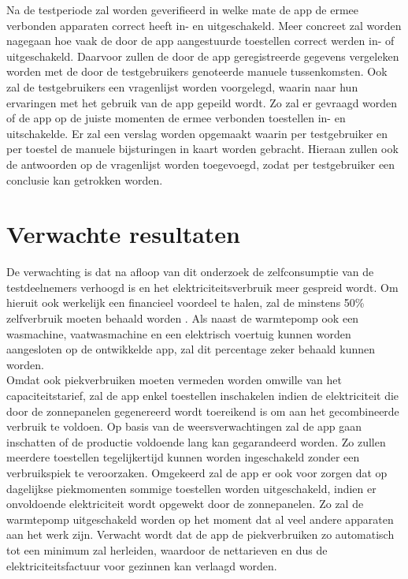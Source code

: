 \documentclass{hogent-article}
\begin{document}
Na de testperiode zal worden geverifieerd in welke mate de app de ermee verbonden apparaten correct heeft in- en uitgeschakeld. Meer concreet zal worden nagegaan hoe vaak de door de app aangestuurde toestellen correct werden in- of uitgeschakeld. Daarvoor zullen de door de app geregistreerde gegevens vergeleken worden met de door de testgebruikers genoteerde manuele tussenkomsten. Ook zal de testgebruikers een vragenlijst worden voorgelegd, waarin naar hun ervaringen met het gebruik van de app gepeild wordt. Zo zal er gevraagd worden of de app op de juiste momenten de ermee verbonden toestellen in- en uitschakelde. Er zal een verslag worden opgemaakt waarin per testgebruiker en per toestel de manuele bijsturingen in kaart worden gebracht. Hieraan zullen ook de antwoorden op de vragenlijst worden toegevoegd, zodat per testgebruiker een conclusie kan getrokken worden.

\section{Verwachte resultaten}%
\label{sec:verwachte-resultaten}

De verwachting is dat na afloop van dit onderzoek de zelfconsumptie van de testdeelnemers verhoogd is en het elektriciteitsverbruik meer gespreid wordt. Om hieruit ook werkelijk een financieel voordeel te halen, zal de minstens 50\% zelfverbruik moeten behaald worden \autocite{Selleslagh2021}. Als naast de warmtepomp ook een wasmachine, vaatwasmachine en een elektrisch voertuig kunnen worden aangesloten op de ontwikkelde app, zal dit percentage zeker behaald kunnen worden. \\

Omdat ook piekverbruiken moeten vermeden worden omwille van het capaciteitstarief, zal de app enkel toestellen inschakelen indien de elektriciteit die door de zonnepanelen gegenereerd wordt toereikend is om aan het gecombineerde verbruik te voldoen. Op basis van de weersverwachtingen zal de app gaan inschatten of de productie voldoende lang kan gegarandeerd worden. Zo zullen meerdere toestellen tegelijkertijd kunnen worden ingeschakeld zonder een verbruikspiek te veroorzaken. Omgekeerd zal de app er ook voor zorgen dat op dagelijkse piekmomenten sommige toestellen worden uitgeschakeld, indien er onvoldoende elektriciteit wordt opgewekt door de zonnepanelen. Zo zal de warmtepomp uitgeschakeld worden op het moment dat al veel andere apparaten aan het werk zijn. Verwacht wordt dat de app de piekverbruiken zo automatisch tot een minimum zal herleiden, waardoor de nettarieven en dus de elektriciteitsfactuur voor gezinnen kan verlaagd worden. \\



\end{document}
